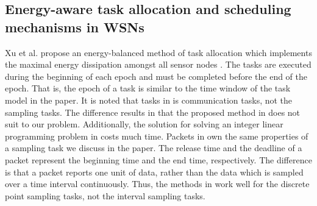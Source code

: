 \documentclass[prodmode,acmtosn]{acmsmall}
\begin{document}
\subsection{Energy-aware task allocation and scheduling mechanisms in WSNs}
Xu et al. propose an energy-balanced method of task allocation which implements the maximal energy dissipation amongst all sensor nodes \cite{2010_near_optimal_mobihoc}. The tasks are executed during the beginning of each epoch and must be completed before the end of the epoch. That is, the epoch of a task is similar to the time window of the task model in the paper. It is noted that tasks in \cite{2010_near_optimal_mobihoc} is communication tasks, not the sampling tasks. The difference results in that the proposed method in \cite{2010_near_optimal_mobihoc} does not suit to our problem. Additionally, the solution for solving an integer linear programming problem in \cite{2010_near_optimal_mobihoc} costs much time. Packets in \cite{2006_time_optimum_mass} own the same properties of a sampling task we discuss in the paper. The release time and the deadline of a packet represent the beginning time and the end time, respectively. The difference is that a packet reports one unit of data, rather than the data which is sampled over a time interval continuously. Thus, the methods in \cite{2006_time_optimum_mass} work well for the discrete point sampling tasks, not the interval sampling tasks.
\end{document}
